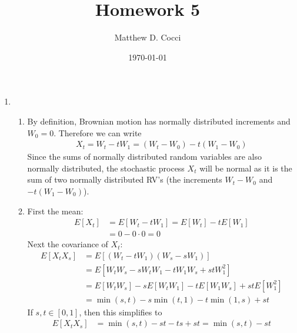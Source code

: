 \documentclass[12pt]{article}
\author{Matthew D. Cocci}
\title{Homework 5}
\date{\today}
\theoremstyle{plain}
\theoremstyle{definition}
\theoremstyle{remark}
\begin{document}
\maketitle


\begin{enumerate}
  \item %
    \begin{enumerate}
      \item %
        By definition, Brownian motion has normally distributed
        increments and $W_0=0$. Therefore we can write
        \begin{align*}
          X_t = W_t - t W_1 = (W_t-W_0) - t(W_1-W_0)
        \end{align*}
        Since the sums of normally distributed random variables are also
        normally distributed, the stochastic process $X_t$ will be
        normal as it is the sum of two normally distributed RV's
        (the increments $W_t-W_0$ and $-t(W_1-W_0)$).
      \item %
        First the mean:
        \begin{align*}
          E[X_t] &= E[W_t - t W_1] = E[W_t] - tE[W_1] \\
          &= 0 - 0 \cdot 0 = 0
        \end{align*}
        Next the covariance of $X_t$:
        \begin{align*}
          E[X_tX_s]
          &= E\left[
            (W_t -tW_1)(W_s -sW_1)
            \right]\\
          &= E\left[
            W_t W_s - sW_tW_1 - t W_1 W_s + st W_1^2
            \right]\\
          &= E[ W_t W_s] - sE[W_tW_1] - tE[W_1 W_s] + stE[ W_1^2 ] \\
          &= \min(s,t) - s\min(t,1) - t\min(1,s) + st
        \end{align*}
        If $s,t\in[0,1]$, then this simplifies to
        \begin{align*}
          E[X_tX_s]
          &= \min(s,t) - st - ts + st
          = \min(s,t) - st
        \end{align*}


\end{enumerate}
\end{enumerate}
\end{document}
